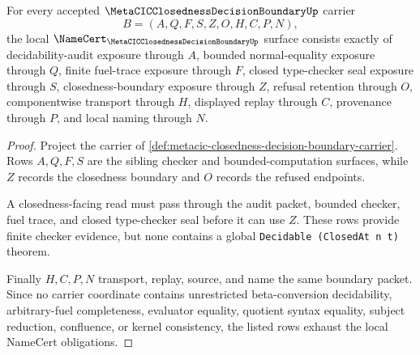 \begin{theorem}
\label{thm:metacic-closedness-decision-boundary-namecert-obligations}
For every accepted $\MetaCICClosednessDecisionBoundaryUp$ carrier
$$
B=(A,Q,F,S,Z,O,H,C,P,N),
$$
the local $\NameCert_{\MetaCICClosednessDecisionBoundaryUp}$ surface consists exactly of decidability-audit exposure through $A$, bounded normal-equality exposure through $Q$, finite fuel-trace exposure through $F$, closed type-checker seal exposure through $S$, closedness-boundary exposure through $Z$, refusal retention through $O$, componentwise transport through $H$, displayed replay through $C$, provenance through $P$, and local naming through $N$.
\end{theorem}
\begin{proof}
Project the carrier of \autoref{def:metacic-closedness-decision-boundary-carrier}. Rows $A,Q,F,S$ are the sibling checker and bounded-computation surfaces, while $Z$ records the closedness boundary and $O$ records the refused endpoints.

A closedness-facing read must pass through the audit packet, bounded checker, fuel trace, and closed type-checker seal before it can use $Z$. These rows provide finite checker evidence, but none contains a global \texttt{Decidable (ClosedAt n t)} theorem.

Finally $H,C,P,N$ transport, replay, source, and name the same boundary packet. Since no carrier coordinate contains unrestricted beta-conversion decidability, arbitrary-fuel completeness, evaluator equality, quotient syntax equality, subject reduction, confluence, or kernel consistency, the listed rows exhaust the local NameCert obligations.
\end{proof}

